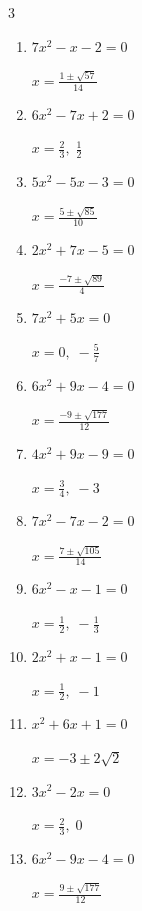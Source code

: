 \begin{multicols}{3}
\begin{enumerate}
  \item $7x^{2}-x-2=0$

        $\displaystyle x=\frac{1\pm \sqrt{57}}{14}$

  \item $6x^{2}-7x+2=0$

        $\displaystyle x=\frac{2}{3}, \; \frac{1}{2}$

  \item $5x^{2}-5x-3=0$

        $\displaystyle x=\frac{5\pm \sqrt{85}}{10}$

  \item $2x^{2}+7x-5=0$

        $\displaystyle x=\frac{-7\pm \sqrt{89}}{4}$

  \item $7x^{2}+5x=0$

        $\displaystyle x=0, \; -\frac{5}{7}$

  \item $6x^{2}+9x-4=0$

        $\displaystyle x=\frac{-9\pm \sqrt{177}}{12}$

\columnbreak %

  \item $4x^{2}+9x-9=0$

        $\displaystyle x=\frac{3}{4}, \; -3$

  \item $7x^{2}-7x-2=0$

        $\displaystyle x=\frac{7\pm \sqrt{105}}{14}$

  \item $6x^{2}-x-1=0$

        $\displaystyle x=\frac{1}{2}, \; -\frac{1}{3}$

  \item $2x^{2}+x-1=0$

        $\displaystyle x=\frac{1}{2}, \; -1$

  \item $x^{2}+6x+1=0$

        $\displaystyle x=-3\pm 2\sqrt{2}$

  \item $3x^{2}-2x=0$

        $\displaystyle x=\frac{2}{3}, \; 0$

  \item $6x^{2}-9x-4=0$

        $\displaystyle x=\frac{9\pm \sqrt{177}}{12}$

\columnbreak %


\end{enumerate}
\end{multicols}
